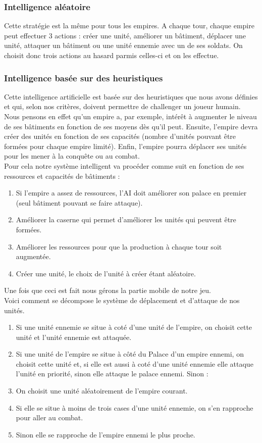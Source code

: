 \documentclass[12pt,a4paper]{article}
\begin{document}
\subsubsection{Intelligence aléatoire}
Cette stratégie est la même pour tous les empires. A chaque tour, chaque empire peut effectuer 3 actions : créer une unité, améliorer un bâtiment, déplacer une unité, attaquer un bâtiment ou une unité ennemie avec un de ses soldats. On choisit donc trois actions au hasard parmis celles-ci et on les effectue. 


\subsubsection{Intelligence basée sur des heuristiques}
Cette intelligence artificielle est basée sur des heuristiques que nous avons définies et qui, selon nos critères, doivent permettre de challenger un joueur humain.\\
Nous pensons en effet qu'un empire a, par exemple, intérêt à augmenter le niveau de ses bâtiments en fonction de ses moyens dès qu'il peut. Ensuite, l'empire devra créer des unités en fonction de ses capacités (nombre d'unités pouvant être formées pour chaque empire limité). Enfin, l'empire pourra  déplacer ses unités pour les mener à la conquête ou au combat. \\
Pour cela notre système intelligent va procéder comme suit en fonction de ses ressources et capacités de bâtiments : 
\begin{enumerate}
    \item Si l'empire a assez de ressources, l'AI doit améliorer son palace en premier (seul bâtiment pouvant se faire attaque).
    \item Améliorer la caserne qui permet d'améliorer les unités qui peuvent être formées. 
    \item Améliorer les ressources pour que la production à chaque tour soit augmentée.
    \item Créer une unité, le choix de l'unité à créer étant aléatoire.
\end{enumerate}
Une fois que ceci est fait nous gérons la partie mobile de notre jeu.\\Voici comment se décompose le système de déplacement et d'attaque de nos unités.
\begin{enumerate}
    \item Si une unité ennemie se situe à coté d'une unité de l'empire, on choisit cette unité et l'unité ennemie est attaquée.
    \item Si une unité de l'empire se situe à côté du Palace d'un empire ennemi, on choisit cette unité et, si elle est aussi à coté d'une unité ennemie elle attaque l'unité en priorité, sinon elle attaque le palace ennemi. Sinon : 
    \item On choisit une unité aléatoirement de l'empire courant. 
    \item Si elle se situe à moins de trois cases d'une unité ennemie, on s'en rapproche pour aller au combat.
    \item Sinon elle se rapproche de l'empire ennemi le plus proche. 
\end{enumerate}
\end{document}
